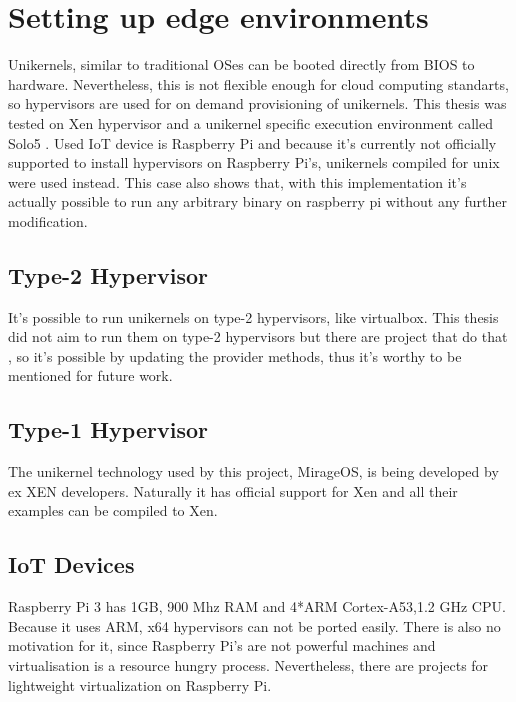 
\section{Setting up edge environments}
Unikernels, similar to traditional OSes can be booted directly from BIOS to hardware. Nevertheless, this is not flexible enough for cloud computing standarts, so hypervisors are used for on demand provisioning of unikernels. 
This thesis was tested on Xen hypervisor and a unikernel specific execution environment called Solo5 \cite{solo5}. Used IoT device is Raspberry Pi and because it's currently not officially supported to install hypervisors on Raspberry Pi's, unikernels compiled for unix were used instead. This case also shows that, with this implementation it's actually possible to run any arbitrary binary on raspberry pi without any further modification.

\subsection{Type-2 Hypervisor}
It's possible to run unikernels on type-2 hypervisors, like virtualbox. This thesis did not aim to run them on type-2 hypervisors but there are project that do that , so it's possible by updating the provider methods, thus it's worthy to be mentioned for future work.

\subsection{Type-1 Hypervisor}
The unikernel technology used by this project, MirageOS, is being developed by ex XEN developers. Naturally it has official support for Xen and all their examples can be compiled to Xen. 
\subsection{IoT Devices}

Raspberry Pi 3 has 1GB, 900 Mhz RAM and 4*ARM Cortex-A53,1.2 GHz CPU. Because it uses ARM, x64 hypervisors can not be ported easily. There is also no motivation for it, since Raspberry Pi's are not powerful machines and virtualisation is a resource hungry process. Nevertheless, there are projects for lightweight virtualization on Raspberry Pi.

